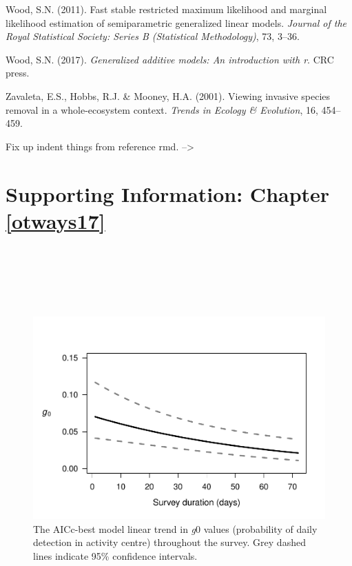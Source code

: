 \documentclass[11pt,a4paper,titlepage,twoside,openright]{style/unimelbthesis}
\begin{document}
\begin{mainmatter}
\leavevmode\hypertarget{ref-wood2011fast}{}%
Wood, S.N. (2011). Fast stable restricted maximum likelihood and marginal likelihood estimation of semiparametric generalized linear models. \emph{Journal of the Royal Statistical Society: Series B (Statistical Methodology)}, 73, 3--36.

\leavevmode\hypertarget{ref-wood2017generalized}{}%
Wood, S.N. (2017). \emph{Generalized additive models: An introduction with r}. CRC press.

\leavevmode\hypertarget{ref-zavaleta2001viewing}{}%
Zavaleta, E.S., Hobbs, R.J. \& Mooney, H.A. (2001). Viewing invasive species removal in a whole-ecosystem context. \emph{Trends in Ecology \& Evolution}, 16, 454--459.

\appendix

Fix up indent things from reference rmd.
--\textgreater{}
\setlength{\parindent}{0in}
\setlength{\leftskip}{0in}
\setlength{\parskip}{8pt}

\hypertarget{otways17-app}{%
\chapter{Supporting Information: Chapter \ref{otways17}}\label{otways17-app}}

\newpage

\(~\)

\(~\)

\(~\)
\begin{figure}

{\centering \includegraphics[width=0.7\linewidth]{figure/otways17-g0t-1} 

}

\caption{The AICc-best model linear trend in \textit{g}0 values (probability of daily detection in activity centre) throughout the survey. Grey dashed lines indicate 95\% confidence intervals.}\label{fig:otways17-g0t}
\end{figure}
\newpage


\end{mainmatter}
\end{document}
